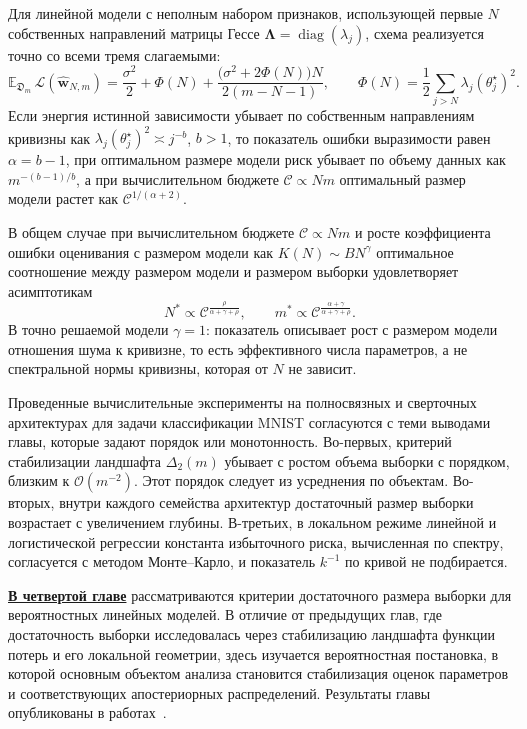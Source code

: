 Для линейной модели с неполным набором признаков, использующей первые $N$ собственных направлений матрицы Гессе $\boldsymbol\Lambda=\operatorname{diag}(\lambda_j)$, схема реализуется точно со всеми тремя слагаемыми:
\begin{equation}
\mathbb E_{\mathfrak D_m}\,\mathcal L(\hat{\mathbf w}_{N, m})
=
\frac{\sigma^2}{2}
+
\Phi(N)
+
\frac{\bigl(\sigma^2+2\Phi(N)\bigr)N}{2(m-N-1)},
\qquad
\Phi(N)=\frac12\sum_{j>N}\lambda_j(\theta_j^\star)^2.
\end{equation}
Если энергия истинной зависимости убывает по собственным направлениям кривизны как $\lambda_j(\theta_j^\star)^2\asymp j^{-b}$, $b>1$, то показатель ошибки выразимости равен $\alpha=b-1$, при оптимальном размере модели риск убывает по объему данных как $m^{-(b-1)/b}$, а при вычислительном бюджете $\mathcal C\propto Nm$ оптимальный размер модели растет как $\mathcal C^{1/(\alpha+2)}$.

В общем случае при вычислительном бюджете $\mathcal C\propto Nm$ и росте коэффициента ошибки оценивания с размером модели как $K(N)\sim BN^{\gamma}$ оптимальное соотношение между размером модели и размером выборки удовлетворяет асимптотикам
\begin{equation}
N^*
\propto
\mathcal C^{\frac{\rho}{\alpha+\gamma+\rho}},
\qquad
m^*
\propto
\mathcal C^{\frac{\alpha+\gamma}{\alpha+\gamma+\rho}}.
\end{equation}
В точно решаемой модели $\gamma=1$: показатель описывает рост с размером модели отношения шума к кривизне, то есть эффективного числа параметров, а не спектральной нормы кривизны, которая от $N$ не зависит.

Проведенные вычислительные эксперименты на полносвязных и сверточных архитектурах для задачи классификации MNIST согласуются с теми выводами главы, которые задают порядок или монотонность. Во-первых, критерий стабилизации ландшафта $\Delta_2(m)$ убывает с ростом объема выборки с порядком, близким к $\mathcal O(m^{-2})$. Этот порядок следует из усреднения по объектам. Во-вторых, внутри каждого семейства архитектур достаточный размер выборки возрастает с увеличением глубины. В-третьих, в локальном режиме линейной и логистической регрессии константа избыточного риска, вычисленная по спектру, согласуется с методом Монте--Карло, и показатель $k^{-1}$ по кривой не подбирается.

\underline{\textbf{В четвертой главе}} рассматриваются критерии достаточного размера выборки для вероятностных линейных моделей. В отличие от предыдущих глав, где достаточность выборки исследовалась через стабилизацию ландшафта функции потерь и его локальной геометрии, здесь изучается вероятностная постановка, в которой основным объектом анализа становится стабилизация оценок параметров и соответствующих апостериорных распределений. Результаты главы опубликованы в работах~\cite{kiselev2025ssdlb,kiselev2025ssdpdp,kiselev2024conf66mipt}.

